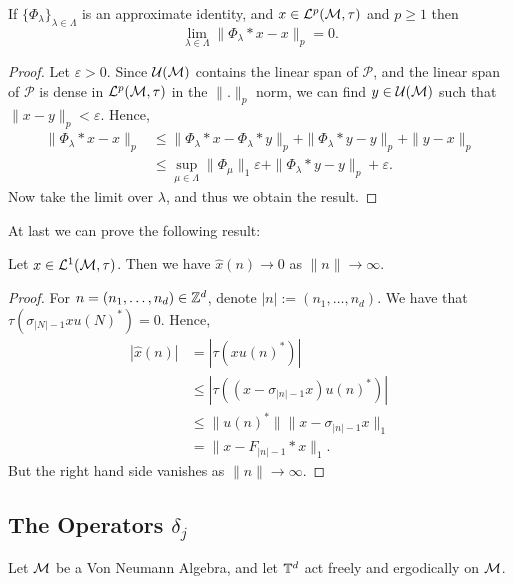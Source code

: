 \begin{proposition}
     If $\{\Phi_\lambda\}_{\lambda \in \Lambda}$
    is an approximate identity, and $x \in \mathcal{L}^p(\mathcal{M},\tau)$
    and $p \geq 1$
    then
    \begin{equation}
        \lim_{\lambda \in \Lambda}\|\Phi_\lambda*x-x\|_p = 0.
    \end{equation}    
\end{proposition}
\begin{proof}
    Let $\varepsilon > 0$.
    Since $\mathcal{U}(\mathcal{M})$ contains the linear span of $\mathcal{P}$,
    and the linear span of $\mathcal{P}$ is dense in $\mathcal{L}^p(\mathcal{M},\tau)$
    in the $\|.\|_p$ norm, we can find $y \in \mathcal{U}(\mathcal{M})$ such
    that $\|x-y\|_p < \varepsilon$. Hence,
    \begin{align}
        \|\Phi_\lambda*x-x\|_p &\leq \|\Phi_\lambda*x-\Phi_\lambda*y\|_p + \|\Phi_\lambda*y-y\|_p + \|y-x\|_p\\
        &\leq \sup_{\mu \in \Lambda} \|\Phi_\mu\|_1\varepsilon + \|\Phi_\lambda*y-y\|_p + \varepsilon.
    \end{align}
    Now take the limit over $\lambda$, and thus we obtain the result.
\end{proof}

At last we can prove the following result:
\begin{proposition}
    Let $x \in \mathcal{L}^1(\mathcal{M},\tau)$. Then we have $\hat{x}(n) \rightarrow 0$
    as $\|n\|\rightarrow\infty$.
\end{proposition}
\begin{proof}
    For $n = (n_1,\ldots,n_d) \in \mathbb{Z}^d$, denote $|n| := (n_1,\ldots,n_d)$.
    We have that $\tau(\sigma_{|N|-1}xu(N)^*) = 0$. Hence,
    \begin{align}
        |\hat{x}(n)| &= |\tau(xu(n)^*)|\\
&\leq |\tau((x-\sigma_{|n|-1}x)u(n)^*)|\\
&\leq \|u(n)^*\|\|x-\sigma_{|n|-1}x\|_1\\
&= \|x-F_{|n|-1}*x\|_1.
    \end{align}
    But the right hand side vanishes as $\|n\|\rightarrow\infty$.
\end{proof}

\subsection{The Operators $\delta_j$}
Let $\mathcal{M}$ be a Von Neumann Algebra, and let $\mathbb{T}^d$
act freely and ergodically on $\mathcal{M}$. 


